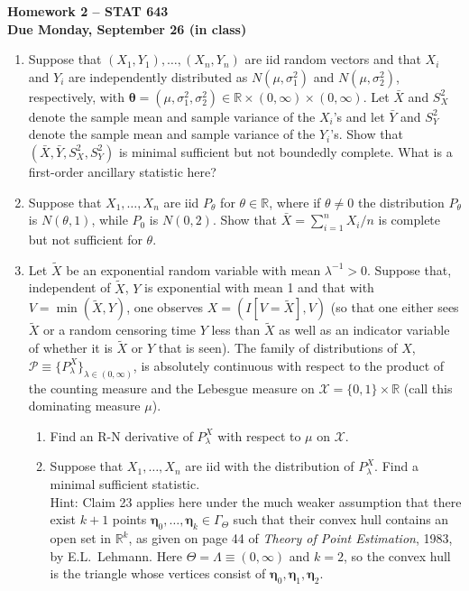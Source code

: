 \documentclass[11pt]{article}
\begin{document}
\vspace{6cm}
\begin{center}\Large \textbf{Homework 2 -- STAT 643} \\
\normalsize \textbf{Due Monday, September 26 (in class)}
\end{center}

\begin{enumerate} \itemsep .3cm
\item Suppose that $(X_1,Y_1),\ldots, (X_n,Y_n)$ are iid random vectors and that $X_i$ and $Y_i$ are independently distributed as 
$N(\mu,\sigma^2_1)$ and $N(\mu,\sigma^2_2)$, respectively, with $\bm{\theta}=(\mu,\sigma_1^2,\sigma_2^2)\in \mathbb{R}\times (0,\infty)\times (0,\infty)$.  Let $\bar{X}$ and $S_X^2$ denote the sample mean  and sample variance of the $X_i$'s and let
$\bar{Y}$ and $S_Y^2$ denote the sample mean  and sample variance of the $Y_i$'s.  Show that $(\bar{X},\bar{Y},S_X^2,S_Y^2)$ is minimal sufficient
but not boundedly complete.  What is a first-order ancillary statistic here?
\item Suppose that $X_1,\ldots,X_n$ are iid $P_\theta$ for $\theta \in \mathbb{R}$, where if $\theta \neq 0$ the distribution $P_\theta$ is $N(\theta,1)$, while $P_0$ is $N(0,2)$.  Show that $\bar{X}=\sum_{i=1}^n X_i/n$ is complete but not sufficient for $\theta$.

    \item  Let $\tilde{X}$ be an exponential random variable with mean $\lambda^{-1}>0$.    Suppose that, independent of $\tilde{X}$, $Y$ is exponential with mean 1
        and that with $V = \min(\tilde{X},Y)$, one observes $X=(I[V=\tilde{X}],V)$ (so that one either sees $\tilde{X}$ or a random censoring time $Y$
        less than $\tilde{X}$ as well as an indicator variable of whether it is $\tilde{X}$ or $Y$ that is seen).
 The family of distributions of $X$, $\mathcal{P}\equiv \{P^X_\lambda\}_{\lambda \in (0,\infty)}$, is absolutely continuous with respect to the
 product of the counting measure and the Lebesgue measure on $\mathcal{X}=\{0,1\}\times \mathbb{R}$ (call this dominating measure $\mu$).

 \begin{enumerate}
\item Find an R-N derivative of $P_\lambda^X$ with respect to $\mu$ on $\mathcal{X}$.
\item Suppose that $X_1,\ldots,X_n$ are iid with the distribution of $P_\lambda^X$.  Find a minimal sufficient statistic. \\
Hint: Claim 23 applies here under the much weaker assumption that there exist $k+1$ points $\bm{\eta}_0,\ldots,\bm{\eta}_k\in \Gamma_\Theta$ such
that their convex hull contains an open set in $\mathbb{R}^k$, as given on page 44 of {\it Theory of Point Estimation}, 1983, by E.L.~Lehmann.  Here $\Theta=\Lambda \equiv (0,\infty)$ and $k=2$, so the convex hull is the triangle whose vertices consist of $\bm{\eta}_0,\bm{\eta}_1,\bm{\eta}_2$.
\end{enumerate}


\end{enumerate}
\end{document}
